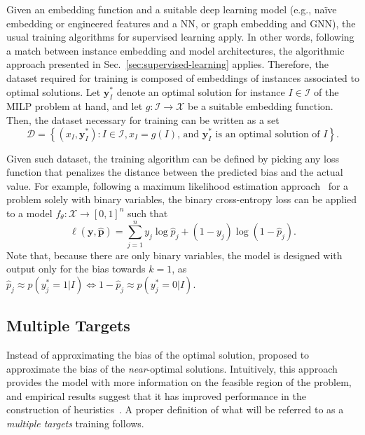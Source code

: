 Given an embedding function and a suitable deep learning model (e.g., naïve embedding or engineered features and a NN, or graph embedding and GNN), the usual training algorithms for supervised learning apply.
In other words, following a match between instance embedding and model architectures, the algorithmic approach presented in Sec.~\ref{sec:supervised-learning} applies.
Therefore, the dataset required for training is composed of embeddings of instances associated to optimal solutions.
Let $\bm{y}^{*}_I$ denote an optimal solution for instance $I\in \mathcal{I}$ of the MILP problem at hand, and let $g: \mathcal{I} \longrightarrow \mathcal{X}$ be a suitable embedding function.
Then, the dataset necessary for training can be written as a set \[
    \mathcal{D} = \left\{ (x_I, \bm{y}^{*}_I) : I \in \mathcal{I}, x_I = g(I) \text{, and } \bm{y}^*_I\text{ is an optimal solution of }I \right\} 
.\] 

Given such dataset, the training algorithm can be defined by picking any loss function that penalizes the distance between the predicted bias and the actual value.
For example, following a maximum likelihood estimation approach~\cite{goodfellowQualitativelyCharacterizingNeural2015} for a problem solely with binary variables, the binary cross-entropy loss can be applied to a model $f_{\theta}: \mathcal{X} \longrightarrow \left[ 0,1 \right]^n$ such that
\begin{equation}\label{eq:bce-loss}
    \ell(\bm{y}, \hat{\bm{p}}) = \sum_{j=1}^{n} y_j \log \hat{p}_j + (1-y_j) \log (1 - \hat{p}_j)
.\end{equation}
Note that, because there are only binary variables, the model is designed with output only for the bias towards $k=1$, as $\hat{p}_j\approx p(y_j^*=1|I) \iff 1-\hat{p}_j\approx p(y_j^*=0|I)$.


\subsection{Multiple Targets}

Instead of approximating the bias of the optimal solution,  proposed to approximate the bias of the \emph{near}-optimal solutions.
Intuitively, this approach provides the model with more information on the feasible region of the problem, and empirical results suggest that it has improved performance in the construction of heuristics~\cite{khalilMIPGNNDataDrivenFramework2022,hanGNNGuidedPredictandSearchFramework2023}.
A proper definition of what will be referred to as a \emph{multiple targets} training follows.

